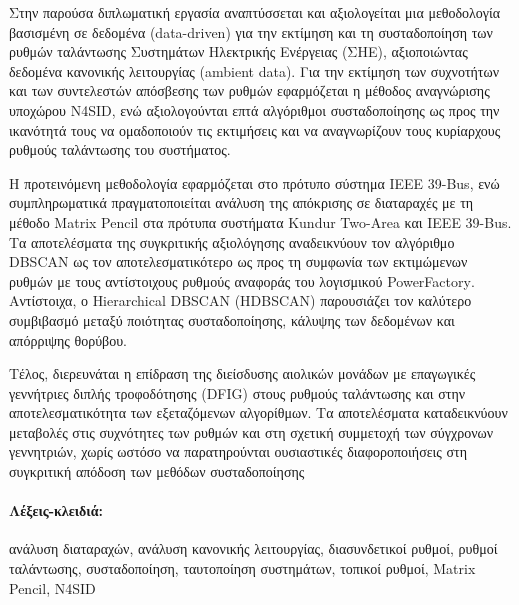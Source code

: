  Στην παρούσα διπλωματική εργασία αναπτύσσεται και αξιολογείται μια μεθοδολογία βασισμένη σε δεδομένα (\textenglish{data-driven}) για την εκτίμηση και τη συσταδοποίηση των ρυθμών ταλάντωσης Συστημάτων Ηλεκτρικής Ενέργειας (ΣΗΕ), αξιοποιώντας δεδομένα κανονικής λειτουργίας (\textenglish{ambient data}). Για την εκτίμηση των συχνοτήτων και των συντελεστών απόσβεσης των ρυθμών εφαρμόζεται η μέθοδος αναγνώρισης υποχώρου \textenglish{N4SID}, ενώ αξιολογούνται επτά αλγόριθμοι συσταδοποίησης ως προς την ικανότητά τους να ομαδοποιούν τις εκτιμήσεις και να αναγνωρίζουν τους κυρίαρχους ρυθμούς ταλάντωσης του συστήματος.

Η προτεινόμενη μεθοδολογία εφαρμόζεται στο πρότυπο σύστημα IEEE 39-Bus, ενώ συμπληρωματικά πραγματοποιείται ανάλυση της απόκρισης σε διαταραχές με τη μέθοδο \textenglish{Matrix Pencil} στα πρότυπα συστήματα \textenglish{Kundur Two-Area} και \textenglish{IEEE 39-Bus}. Τα αποτελέσματα της συγκριτικής αξιολόγησης αναδεικνύουν τον αλγόριθμο \textenglish{DBSCAN} ως τον αποτελεσματικότερο ως προς τη συμφωνία των εκτιμώμενων ρυθμών με τους αντίστοιχους ρυθμούς αναφοράς του λογισμικού \textenglish{PowerFactory}. Αντίστοιχα, ο \textenglish{Hierarchical DBSCAN (HDBSCAN)} παρουσιάζει τον καλύτερο συμβιβασμό μεταξύ ποιότητας συσταδοποίησης, κάλυψης των δεδομένων και απόρριψης θορύβου.

Τέλος, διερευνάται η επίδραση της διείσδυσης αιολικών μονάδων με επαγωγικές γεννήτριες διπλής τροφοδότησης (\textenglish{DFIG}) στους ρυθμούς ταλάντωσης και στην αποτελεσματικότητα των εξεταζόμενων αλγορίθμων. Τα αποτελέσματα καταδεικνύουν μεταβολές στις συχνότητες των ρυθμών και στη σχετική συμμετοχή των σύγχρονων γεννητριών, χωρίς ωστόσο να παρατηρούνται ουσιαστικές διαφοροποιήσεις στη συγκριτική απόδοση των μεθόδων συσταδοποίησης

\paragraph{Λέξεις-κλειδιά:} ανάλυση διαταραχών, ανάλυση κανονικής λειτουργίας, διασυνδετικοί ρυθμοί, ρυθμοί ταλάντωσης, συσταδοποίηση, ταυτοποίηση συστημάτων, τοπικοί ρυθμοί, \textenglish{Matrix Pencil}, N4SID

